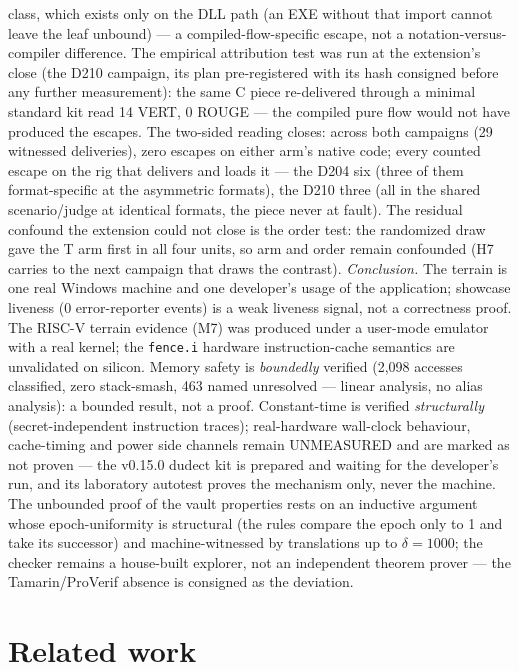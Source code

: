 \documentclass[11pt,a4paper]{article}
\newcommand{\code}[1]{\texttt{\small #1}}
\begin{document}
class, which exists only on the DLL path (an EXE without that import
cannot leave the leaf unbound) --- a compiled-flow-specific escape,
not a notation-versus-compiler difference. The empirical
attribution test was run at the extension's close (the D210 campaign,
its plan pre-registered with its hash consigned before any further
measurement): the same C piece re-delivered through a minimal
standard kit read 14 VERT, 0 ROUGE --- the compiled pure flow would
not have produced the escapes. The two-sided reading closes: across
both campaigns (29 witnessed deliveries), zero escapes on either
arm's native code; every counted escape on the rig that delivers and
loads it --- the D204 six (three of them format-specific at the
asymmetric formats), the D210 three (all in the shared scenario/judge
at identical formats, the piece never at fault). The residual
confound the extension could not close is the order test: the
randomized draw gave the T arm first in all four units, so arm and
order remain confounded (H7 carries to the next campaign that draws
the contrast).
\emph{Conclusion.} The terrain is one real Windows machine and one
developer's usage of the application; showcase liveness (0 error-reporter
events) is a weak liveness signal, not a correctness proof. The RISC-V terrain
evidence (M7) was produced under a user-mode emulator with a real
kernel; the \code{fence.i} hardware instruction-cache semantics are
unvalidated on silicon. Memory safety
is \emph{boundedly} verified (2{,}098 accesses classified, zero
stack-smash, 463 named unresolved --- linear analysis, no alias
analysis): a bounded result, not a proof. Constant-time is verified
\emph{structurally} (secret-independent instruction traces); real-hardware
wall-clock behaviour, cache-timing and power side channels remain
UNMEASURED and are marked as not proven --- the v0.15.0 dudect kit is prepared
and waiting for the developer's run, and its laboratory autotest
proves the mechanism only, never the machine. The unbounded proof of
the vault properties rests on an inductive argument whose
epoch-uniformity is structural (the rules compare the epoch only to
1 and take its successor) and machine-witnessed by translations up
to $\delta = 1000$; the checker remains a house-built explorer, not
an independent theorem prover --- the Tamarin/ProVerif absence is
consigned as the deviation.

\section{Related work}\label{sec:related}
\end{document}
